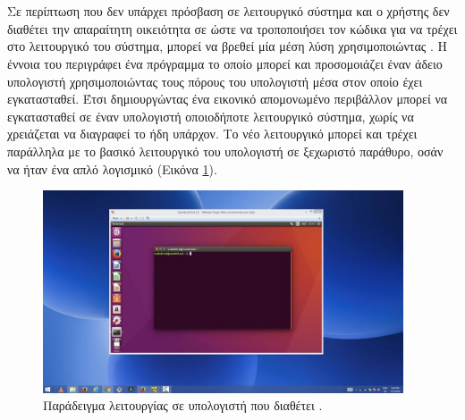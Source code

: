 \documentclass[12pt]{report}
\begin{document}
{{}

{}

\section{{}}
Σε περίπτωση που δεν υπάρχει πρόσβαση σε λειτουργικό σύστημα {} και ο χρήστης δεν διαθέτει την απαραίτητη οικειότητα σε {} ώστε να τροποποιήσει τον κώδικα για να τρέχει στο λειτουργικό του
σύστημα, μπορεί να βρεθεί μία μέση λύση χρησιμοποιώντας {}. Η έννοια του {} περιγράφει ένα πρόγραμμα το οποίο μπορεί και προσομοιάζει έναν άδειο υπολογιστή χρησιμοποιώντας
τους πόρους του υπολογιστή μέσα στον οποίο έχει εγκατασταθεί. Έτσι δημιουργώντας ένα εικονικό απομονωμένο περιβάλλον μπορεί να εγκατασταθεί σε έναν υπολογιστή οποιοδήποτε λειτουργικό σύστημα, χωρίς να χρειάζεται να διαγραφεί
το ήδη υπάρχον. Το νέο λειτουργικό μπορεί και τρέχει παράλληλα με το βασικό λειτουργικό του υπολογιστή σε ξεχωριστό παράθυρο, οσάν να ήταν ένα απλό λογισμικό (Εικόνα \ref{fig:virtualbox}).

\begin{figure}
	\center	
	\includegraphics[width=0.95\textwidth]{virtualbox}
	\captionsetup{name=Εικόνα, width=0.8\textwidth}
	\caption{Παράδειγμα λειτουργίας {} σε υπολογιστή που διαθέτει {}.}
	\label{fig:virtualbox}
\end{figure}

}
\end{document}
